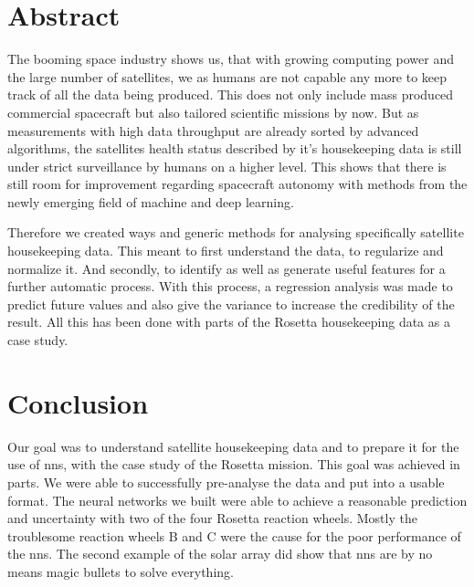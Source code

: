 {{%
{\mainmatter
	\pagestyle{scrheadings}
	
\chapter*{Abstract}
The booming space industry shows us, that with growing computing power and the large number of satellites, we as humans are not capable any more to keep track of all the data being produced. This does not only include mass produced commercial spacecraft but also tailored scientific missions by now. But as measurements with high data throughput are already sorted by advanced algorithms, the satellites health status described by it's housekeeping data is still under strict surveillance by humans on a higher level. This shows that there is still room for improvement regarding spacecraft autonomy with methods from the newly emerging field of machine and deep learning.

Therefore we created ways and generic methods for analysing specifically satellite housekeeping data. This meant to first understand the data, to regularize and normalize it. And secondly, to identify as well as generate useful features for a further automatic process. With this process, a regression analysis was made to predict future values and also give the variance to increase the credibility of the result. All this has been done with parts of the Rosetta housekeeping data as a case study.









\chapter{Conclusion}
Our goal was to understand satellite housekeeping data and to prepare it for the use of \acfp{nn}, with the case study of the Rosetta mission. This goal was achieved in parts. We were able to successfully pre-analyse the data and put into a usable format. The neural networks we built were able to achieve a reasonable prediction and uncertainty with two of the four Rosetta reaction wheels. Mostly the troublesome reaction wheels B and C were the cause for the poor performance of the \acp{nn}. The second example of the solar array did show that \acp{nn} are by no means magic bullets to solve everything.%

}}}
